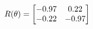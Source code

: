 \documentclass[preview]{standalone}
\begin{document}
\begin{align*}
\special{dvisvgm:raw <g id='unique000'>}R(\theta) = \begin{bmatrix}-0.97 & 0.22\\-0.22 & -0.97\end{bmatrix}\special{dvisvgm:raw </g>}
\end{align*}
\end{document}
